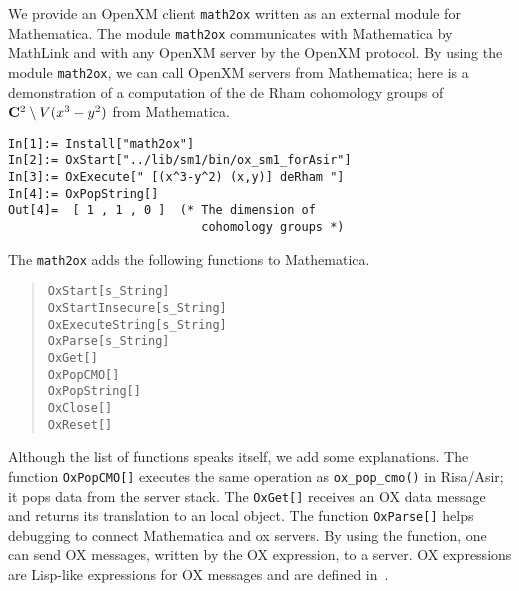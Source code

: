 We provide an OpenXM client {\tt math2ox} written as an external module
for Mathematica.  
The module {\tt math2ox} communicates with Mathematica by MathLink and
with any OpenXM server by the OpenXM protocol.  
By using the module {\tt math2ox},
we can call OpenXM servers from Mathematica;
here is a demonstration of a computation of the de Rham cohomology groups
of ${\bf C}^2 \setminus V(x^3-y^2)$ from Mathematica.
{\footnotesize
\begin{verbatim}
In[1]:= Install["math2ox"]
In[2]:= OxStart["../lib/sm1/bin/ox_sm1_forAsir"]
In[3]:= OxExecute[" [(x^3-y^2) (x,y)] deRham "]
In[4]:= OxPopString[]
Out[4]=  [ 1 , 1 , 0 ]  (* The dimension of 
                           cohomology groups *)
\end{verbatim}
}

The {\tt math2ox} adds the following functions to Mathematica.
\begin{quote}
{\tt OxStart[s\_String]} \\
{\tt OxStartInsecure[s\_String]} \\
{\tt OxExecuteString[s\_String]}  \\
{\tt OxParse[s\_String]} \\
{\tt OxGet[]} \\
{\tt OxPopCMO[]} \\
{\tt OxPopString[]} \\
{\tt OxClose[]} \\
{\tt OxReset[]}
\end{quote}
Although the list of functions speaks itself,
we add some explanations.
The function {\tt OxPopCMO[]} executes the same operation
as {\tt ox\_pop\_cmo()} in Risa/Asir;
it pops data from the server stack.
The {\tt OxGet[]} receives an OX data message
and returns its translation to an local object.
The function {\tt OxParse[]} helps debugging to connect Mathematica
and ox servers.
By using the function, one can send OX messages,
written by the OX expression, to a server. 
OX expressions are Lisp-like expressions for OX messages and are defined
in~\cite{ox-rfc-100}.  
